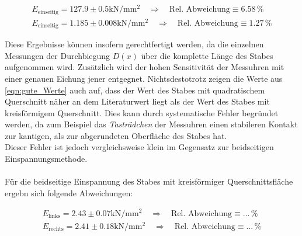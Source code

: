 \begin{gather}
\label{eqn:gute_Werte}
    E_\text{einseitig} = 127.9 \pm 0.5 \unit{\kilo \newton \per \milli \meter \squared}\quad \Rightarrow \quad \text{Rel. Abweichung} \equiv 6.58\,\unit{\percent}\\
    E_\text{einseitig} =1.185   \pm 0.008\unit{\kilo \newton \per \milli \meter \squared}\quad \Rightarrow \quad \text{Rel. Abweichung} \equiv 1.27\,\unit{\percent}
\end{gather}

\noindent Diese Ergebnisse können insofern gerechtfertigt werden, da die einzelnen Messungen der Durchbiegung $D(x)$ über die komplette Länge 
des Stabes aufgenommen wird. Zusätzlich wird der hohen Sensitivität der Messuhren mit einer genauen Eichung jener entgegnet.
Nichtsdestotrotz zeigen die Werte aus \eqref{eqn:gute_Werte} auch auf, dass der Wert des Stabes mit quadratischem Querschnitt näher an dem
Literaturwert liegt als der Wert des Stabes mit kreisförmigem Querschnitt. Dies kann durch systematische Fehler begründet werden, da zum Beispiel das
\emph{Tasträdchen} der Messuhren einen stabileren Kontakt zur kantigen, als zur abgerundeten Oberfläche des Stabes hat.\\
Dieser Fehler ist jedoch vergleichsweise klein im Gegensatz zur beidseitigen Einspannungsmethode.\\\\
Für die beidseitige Einspannung des Stabes mit kreisförmiger Querschnittsfläche ergebn sich folgende Abweichungen:

\begin{gather}
\label{eqn:schlechte_Werte_k}
    E_\text{links} =    2.43    \pm 0.07\unit{\kilo \newton \per \milli \meter \squared}\quad \Rightarrow \quad \text{Rel. Abweichung} \equiv ...\,\unit{\percent}\\
    E_\text{rechts} =   2.41    \pm 0.18\unit{\kilo \newton \per \milli \meter \squared}\quad \Rightarrow \quad \text{Rel. Abweichung} \equiv ...\,\unit{\percent}
\end{gather}


